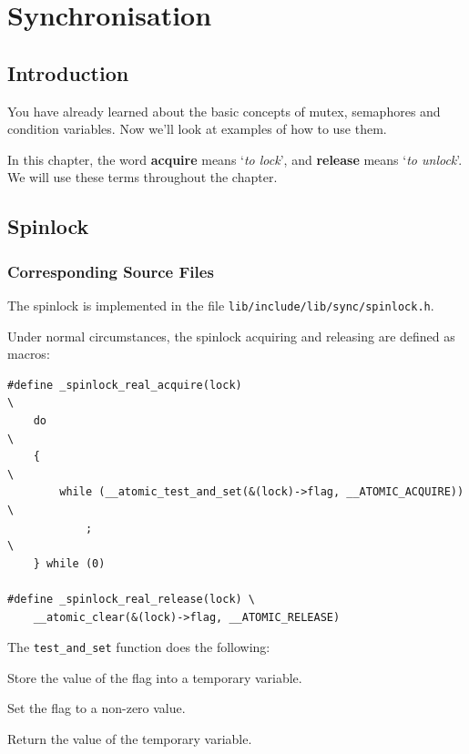 \chapter{Synchronisation}

\section{Introduction}

You have already learned about the basic concepts of mutex, semaphores and condition variables. Now we'll
look at examples of how to use them.

In this chapter, the word \textbf{acquire} means `\textit{to lock}', and \textbf{release} means
`\textit{to unlock}'. We will use these terms throughout the chapter.

\section{Spinlock}

\subsection{Corresponding Source Files}

The spinlock is implemented in the file \texttt{lib/include/lib/sync/spinlock.h}.

Under normal circumstances, the spinlock acquiring and releasing are defined as macros:

\begin{verbatim}
#define _spinlock_real_acquire(lock)                                    \
    do                                                                  \
    {                                                                   \
        while (__atomic_test_and_set(&(lock)->flag, __ATOMIC_ACQUIRE))  \
            ;                                                           \
    } while (0)

#define _spinlock_real_release(lock) \
    __atomic_clear(&(lock)->flag, __ATOMIC_RELEASE)
\end{verbatim}

\begin{tip*}{The \texttt{test\_and\_set} function does the following:}
    \item Store the value of the flag into a temporary variable.
    \item Set the flag to a non-zero value.
    \item Return the value of the temporary variable.
\end{tip*}


